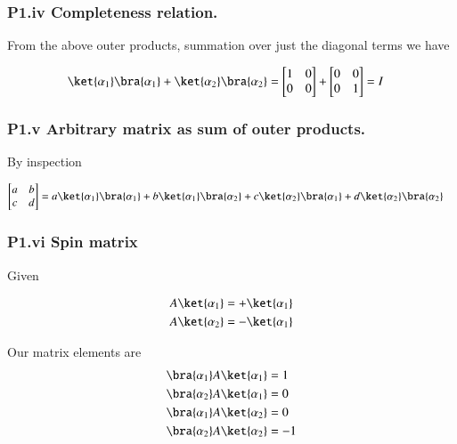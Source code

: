 \subsubsection{P1.iv Completeness relation.}

From the above outer products, summation over just the diagonal terms we have

\begin{align*}
\ket{\alpha_1}\bra{\alpha_1} + \ket{\alpha_2}\bra{\alpha_2} &=
\begin{bmatrix}
1 & 0 \\
0 & 0
\end{bmatrix} +
\begin{bmatrix}
0 & 0 \\
0 & 1
\end{bmatrix} 
= I
\end{align*}

\subsubsection{P1.v Arbitrary matrix as sum of outer products.}

By inspection

\begin{align*}
\begin{bmatrix}
a & b \\
c & d
\end{bmatrix} 
&=
a \ket{\alpha_1}\bra{\alpha_1} 
+b \ket{\alpha_1}\bra{\alpha_2} 
+c \ket{\alpha_2}\bra{\alpha_1} 
+d \ket{\alpha_2}\bra{\alpha_2}
\end{align*}

\subsubsection{P1.vi Spin matrix}

Given

\begin{align*}
A \ket{\alpha_1} &= + \ket{\alpha_1} \\
A \ket{\alpha_2} &= - \ket{\alpha_1}
\end{align*}

Our matrix elements are
\begin{align*}
\bra{\alpha_1} A \ket{\alpha_1} &= 1 \\
\bra{\alpha_2} A \ket{\alpha_1} &= 0 \\
\bra{\alpha_1} A \ket{\alpha_2} &= 0 \\
\bra{\alpha_2} A \ket{\alpha_2} &= -1
\end{align*}

